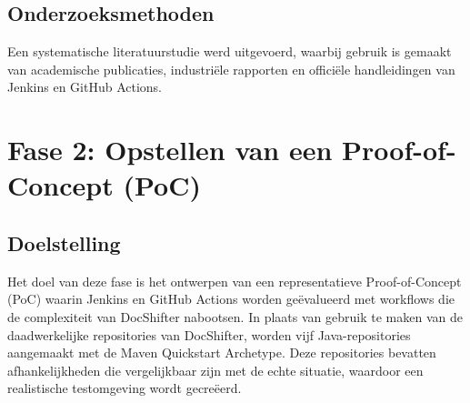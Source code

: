 \subsection*{Onderzoeksmethoden}
Een systematische literatuurstudie werd uitgevoerd, waarbij gebruik is gemaakt van academische publicaties, industriële rapporten en officiële handleidingen van Jenkins en GitHub Actions.

\section{Fase 2: Opstellen van een Proof-of-Concept (PoC)}
\subsection*{Doelstelling}
Het doel van deze fase is het ontwerpen van een representatieve Proof-of-Concept (PoC) waarin Jenkins en GitHub Actions worden geëvalueerd met workflows die de complexiteit van DocShifter nabootsen. In plaats van gebruik te maken van de daadwerkelijke repositories van DocShifter, worden vijf Java-repositories aangemaakt met de Maven Quickstart Archetype. Deze repositories bevatten afhankelijkheden die vergelijkbaar zijn met de echte situatie, waardoor een realistische testomgeving wordt gecreëerd.

